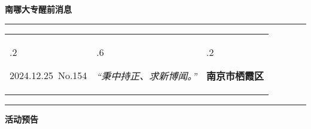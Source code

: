 \documentclass[letterpaper, 12pt]{article}
\begin{document}
\begin{center}
    \Huge\textbf{南哪大专醒前消息}
\end{center}
\vspace{4mm}
\hrule
\renewcommand\tabularxcolumn[1]{m{#1}}
\begin{tabularx}{\textwidth}{>{\hsize.2\hsize}X>{\hsize.6\hsize}X>{\hsize.2\hsize}X}
    \begin{flushleft}
        2024.12.25\, No.154
    \end{flushleft}
    &
    \begin{center}
        \textit{“秉中持正、求新博闻。”}
    \end{center}
    &
    \begin{flushright}
        \textbf{南京市栖霞区}
    \end{flushright}
\end{tabularx}
\vspace{-3.5mm}
\hrule
\vspace{4mm}
\centerline{\huge\textbf{活动预告}}
\end{document}
